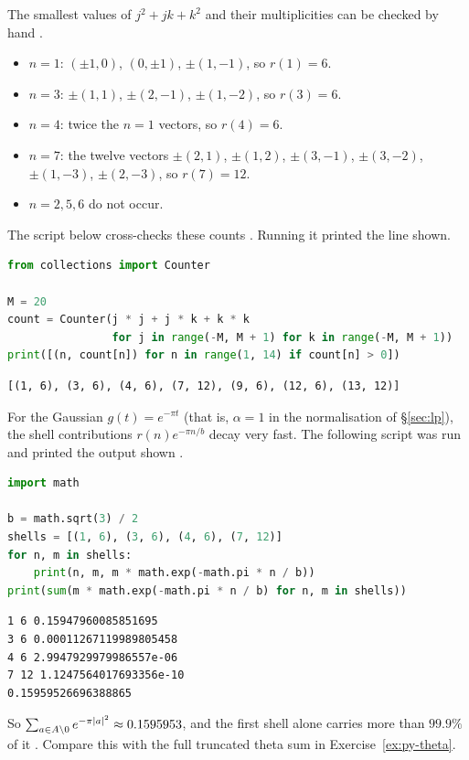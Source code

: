 \begin{example}\label{ex:shells}
The smallest values of $j^2+jk+k^2$ and their multiplicities can be checked by hand \tierC{}.
\begin{itemize}
\item $n=1$: $(\pm1,0)$, $(0,\pm1)$, $\pm(1,-1)$, so $r(1)=6$.
\item $n=3$: $\pm(1,1)$, $\pm(2,-1)$, $\pm(1,-2)$, so $r(3)=6$.
\item $n=4$: twice the $n=1$ vectors, so $r(4)=6$.
\item $n=7$: the twelve vectors $\pm(2,1)$, $\pm(1,2)$, $\pm(3,-1)$, $\pm(3,-2)$, $\pm(1,-3)$, $\pm(2,-3)$, so $r(7)=12$.
\item $n=2,5,6$ do not occur.
\end{itemize}
The script below cross-checks these counts \tierX{}. Running it printed the line shown.
\begin{lstlisting}[language=Python]
from collections import Counter

M = 20
count = Counter(j * j + j * k + k * k
                for j in range(-M, M + 1) for k in range(-M, M + 1))
print([(n, count[n]) for n in range(1, 14) if count[n] > 0])
\end{lstlisting}
\begin{lstlisting}
[(1, 6), (3, 6), (4, 6), (7, 12), (9, 6), (12, 6), (13, 12)]
\end{lstlisting}
For the Gaussian $g(t)=e^{-\pi t}$ (that is, $\alpha=1$ in the normalisation of \S\ref{sec:lp}), the shell
contributions $r(n)e^{-\pi n/b}$ decay very fast. The following script was run and printed the output shown \tierX{}.
\begin{lstlisting}[language=Python]
import math

b = math.sqrt(3) / 2
shells = [(1, 6), (3, 6), (4, 6), (7, 12)]
for n, m in shells:
    print(n, m, m * math.exp(-math.pi * n / b))
print(sum(m * math.exp(-math.pi * n / b) for n, m in shells))
\end{lstlisting}
\begin{lstlisting}
1 6 0.15947960085851695
3 6 0.00011267119989805458
4 6 2.9947929979986557e-06
7 12 1.1247564017693356e-10
0.15959526696388865
\end{lstlisting}
So $\sum_{a\in A\setminus0}e^{-\pi|a|^2}\approx0.1595953$, and the first shell alone carries more than $99.9\%$ of it
\tierX{}. Compare this with the full truncated theta sum in Exercise~\ref{ex:py-theta}.
\end{example}

